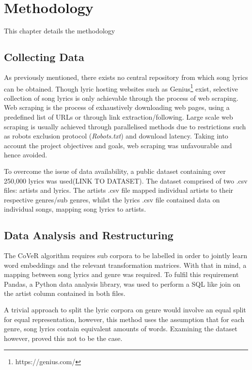 \chapter{Methodology}
This chapter details the methodology 
\label{chap:data_methodology}
\section{Collecting Data}
As previously mentioned, there exists no central repository from which song lyrics can be obtained. Though lyric hosting websites such as Genius\footnote{https://genius.com/} exist, selective collection of song lyrics is only achievable through the process of web scraping. Web scraping is the process of exhaustively downloading web pages, using a predefined list of URLs or through link extraction/following. Large scale web scraping is usually achieved through parallelised methods due to restrictions such as robots exclusion protocol (\textit{Robots.txt}) and download latency. Taking into account the project objectives and goals, web scraping was unfavourable and hence avoided.

\noindent
\newline
To overcome the issue of data availability, a public dataset containing over 250,000 lyrics was used(LINK TO DATASET). The dataset comprised of two .csv files: artists and lyrics. The artists .csv file mapped individual artists to their respective genres/sub genres, whilst the lyrics .csv file contained data on individual songs, mapping song lyrics to artists. 
\section{Data Analysis and Restructuring}
The CoVeR algorithm requires sub corpora to be labelled in order to jointly learn word embeddings and the relevant transformation matrices. With that in mind, a mapping between song lyrics and genre was required. To fulfil this requirement Pandas, a Python data analysis library, was used to perform a SQL like join on the artist column contained in both files.

\noindent
\newline
A trivial approach to split the lyric corpora on genre would involve an equal split for equal representation, however, this method uses the assumption that for each genre, song lyrics contain equivalent amounts of words. Examining the dataset however, proved this not to be the case.

